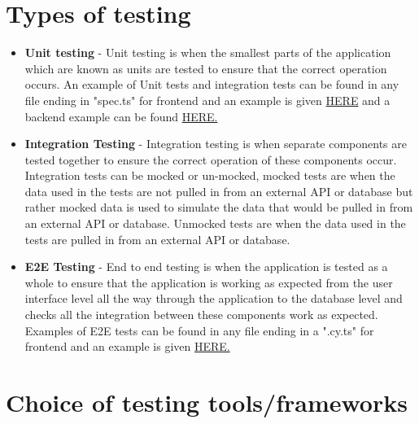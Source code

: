 \documentclass[12pt]{article}
\begin{document}
\section{Types of testing}
\begin{itemize}
    \item \textbf{Unit testing} - Unit testing is when the smallest parts of the application which are known as units are tested to ensure that the correct operation occurs. An example of Unit tests and integration tests can be found in any file ending in "spec.ts" for frontend and an example is given \href {https://github.com/COS301-SE-2023/Domain-Pulse-A-Sentiment-Analysis-Platform/blob/dev/frontend/src/app/main/main.component.spec.ts}{HERE} and a backend example can be found \href {https://github.com/COS301-SE-2023/Domain-Pulse-A-Sentiment-Analysis-Platform/blob/main/backend/engine/analyser/tests.py}{HERE.}
    \item \textbf{Integration Testing} - Integration testing is when separate components are tested together to ensure the correct operation of these components occur. Integration tests can be mocked or un-mocked, mocked tests are when the data used in the tests are not pulled in from an external API or database but rather mocked data is used to simulate the data that would be pulled in from an external API or database. Unmocked tests are when the data used in the tests are pulled in from an external API or database.
    \item \textbf{E2E Testing} - End to end testing is when the application is tested as a whole to ensure that the application is working as expected from the user interface level all the way through the application to the database level and checks all the integration between these components work as expected. Examples of E2E tests can be found in any file ending in a ".cy.ts" for frontend and an example is given \href {https://github.com/COS301-SE-2023/Domain-Pulse-A-Sentiment-Analysis-Platform/blob/main/frontend/cypress/e2e/accountsManage.cy.ts}{HERE.}
\end{itemize}
\newpage
\section{Choice of testing tools/frameworks}
\end{document}
